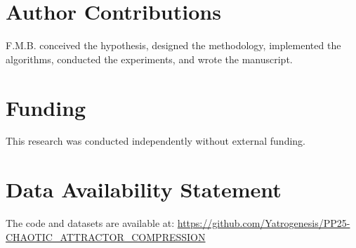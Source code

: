 \documentclass[utf8]{FrontiersinVancouver}
\begin{document}
\section*{Author Contributions}
F.M.B. conceived the hypothesis, designed the methodology, implemented the algorithms, conducted the experiments, and wrote the manuscript.

\section*{Funding}
This research was conducted independently without external funding.

\section*{Data Availability Statement}
The code and datasets are available at: \url{https://github.com/Yatrogenesis/PP25-CHAOTIC_ATTRACTOR_COMPRESSION}



\end{document}
